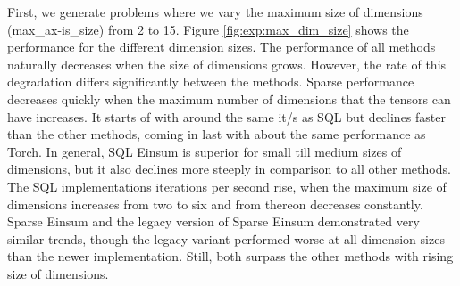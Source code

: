 \noindent
First, we generate problems where we vary the maximum size of dimensions (max\_ax-is\_size)
from 2 to 15. Figure \ref{fig:exp:max_dim_size} shows the performance for the different
dimension sizes. The performance of all methods naturally decreases when the size of dimensions
grows. However, the rate of this degradation differs significantly between the methods.
Sparse performance decreases quickly when the maximum number of dimensions that the tensors
can have increases. It starts of with around the same it/s as SQL but declines faster than
the other methods, coming in last with about the same performance as Torch. In general,
SQL Einsum is superior for small till medium sizes of dimensions, but it also declines more
steeply in comparison to all other methods. The SQL implementations iterations per second rise,
when the maximum size of dimensions increases from two to six and from thereon decreases constantly.
Sparse Einsum and the legacy version of Sparse Einsum demonstrated very similar trends,
though the legacy variant performed worse at all dimension sizes than the newer implementation.
Still, both surpass the other methods with rising size of dimensions.

